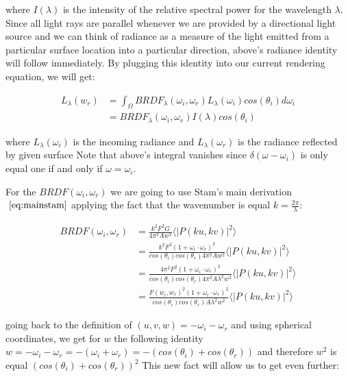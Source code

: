 where $I(\lambda)$ is the intensity of the relative spectral power for the wavelength $\lambda$. 
Since all light rays are parallel whenever we are provided by a directional light source and we can think of radiance as a measure of the light emitted from a particular surface location into a particular direction, above's radiance identity will follow immediately. 
By plugging this identity into our current rendering equation, we will get:

\begin{align}
L_{\lambda}(w_r) 
& = \int_{\Omega} BRDF_{\lambda}(\omega_i, \omega_r) L_{\lambda}(\omega_i) cos(\theta_i) d\omega_i \nonumber \\
& = BRDF_{\lambda}(\omega_i, \omega_r) I(\lambda) cos(\theta_i)
\end{align}

where $L_{\lambda}(\omega_i)$ is the incoming radiance and $L_{\lambda}(\omega_r)$ is the radiance reflected by given surface
Note that above's integral vanishes since $\delta(\omega-\omega_i)$ is only equal one if and only if $\omega = \omega_i$.

For the $BRDF(\omega_i, \omega_r)$ we are going to use Stam's main derivation $~\eqref{eq:mainstam}$ applying the fact that the wavenumber is equal $k=\frac{2\pi}{\lambda}$:

\begin{align}
BRDF(\omega_i, \omega_r) 
& = \frac{k^2 F^2 G}{4\pi^2 A w^2} \langle \left|P(ku, kv) \right|^2\rangle \nonumber\\
& = \frac{k^2 F^2 (1 + \omega_i \cdot \omega_r)^2}{cos(\theta_i)cos(\theta_r) 4\pi^2 A w^2} \langle \left|P(ku, kv)  \right|^2\rangle \nonumber\\
& = \frac{4 \pi^2 F^2 (1 + \omega_i \cdot \omega_r)^2}{cos(\theta_i)cos(\theta_r) 4\pi^2 A \lambda^2 w^2} \langle \left|P(ku, kv)  \right|^2\rangle \nonumber\\
& = \frac{F(w_i, w_r)^2 (1 + \omega_i \cdot \omega_r)^2}{cos(\theta_i)cos(\theta_r) A \lambda^2 w^2} \langle \left|P(ku, kv)  \right|^2\rangle
\end{align}

going back to the definition of $(u,v,w)= -\omega_i - \omega_r$ and using spherical coordinates, we get for $w$ the following identity $w = -\omega_i - \omega_r = -(\omega_i + \omega_r) = -(cos(\theta_i)+cos(\theta_r))$ and therefore $w^2$ is equal $(cos(\theta_i)+cos(\theta_r))^2$
This new fact will allow us to get even further:

